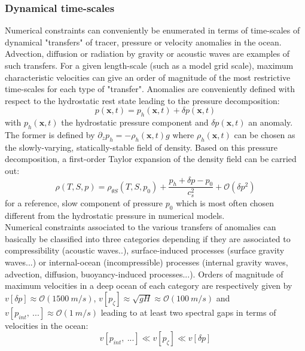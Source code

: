 \subsubsection{Dynamical time-scales}
Numerical constraints can conveniently be enumerated in terms of time-scales of dynamical "transfers" of tracer, pressure or velocity anomalies in the ocean. Advection, diffusion or radiation by gravity or acoustic waves are examples of such transfers. For a given length-scale (such as a model grid scale), maximum characteristic velocities can give an order of magnitude of the most restrictive time-scales for each type of "transfer". Anomalies are conveniently defined with respect to the hydrostatic rest state leading to the pressure decomposition:
\begin{equation}
	\displaystyle
	\label{decompoP_0}
	p(\mathbf{x},t)=p_h(\mathbf{x},t)+\delta p(\mathbf{x},t)
\end{equation}
with $p_h(\mathbf{x},t)$ the hydrostatic pressure component and $\delta p(\mathbf{x},t)$ an anomaly. The former is defined by $\partial_z p_h=-\rho_h(\mathbf{x},t) g$ where $\rho_h(\mathbf{x},t)$ can be chosen as the slowly-varying, statically-stable field of density. Based on this pressure decomposition, a first-order Taylor expansion of the density field can be carried out:
\begin{equation}
  \displaystyle 
	\label{decompor_0}
  \rho(T,S,p)=\rho_{\theta S}(T,S,p_0)+\frac{p_h+\delta p-p_0}{c_s^2}+\mathcal{O}(\delta p^2)
\end{equation}
for a reference, slow component of pressure $p_0$ which is most often chosen different from the hydrostatic pressure in numerical models.\\
Numerical constraints associated to the various transfers of anomalies can basically be classified into three categories depending if they are associated to compressibility (acoustic waves..), surface-induced processes (surface gravity waves...) or internal-ocean (incompressible) processes (internal gravity waves, advection, diffusion, buoyancy-induced processes...). Orders of magnitude of maximum velocities in a deep ocean of each category are respectively given by $v[\delta p]\approx \mathcal{O}(1500\ m/s)$, $v[p_\zeta]\approx\sqrt{g H}\approx \mathcal{O}(100\ m/s)$ and $v[p_{int},\ ...]\approx \mathcal{O}(1\ m/s)$ leading to at least two spectral gaps in terms of velocities in the ocean:
\begin{equation}
	\displaystyle
	\label{velocityscales}
	v[p_{int},\ ...] \ll v[p_\zeta] \ll v[\delta p]
\end{equation} 
